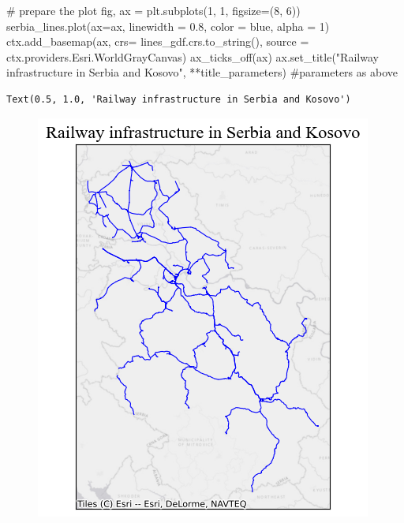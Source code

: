 \documentclass[
  letterpaper,
  DIV=11,
  numbers=noendperiod]{scrreprt}
\newenvironment{Shaded}{\begin{snugshade}}{\end{snugshade}}
\newcommand{\CommentTok}[1]{\textcolor[rgb]{0.37,0.37,0.37}{#1}}
\newcommand{\DecValTok}[1]{\textcolor[rgb]{0.68,0.00,0.00}{#1}}
\newcommand{\FloatTok}[1]{\textcolor[rgb]{0.68,0.00,0.00}{#1}}
\newcommand{\NormalTok}[1]{\textcolor[rgb]{0.00,0.23,0.31}{#1}}
\newcommand{\OperatorTok}[1]{\textcolor[rgb]{0.37,0.37,0.37}{#1}}
\newcommand{\StringTok}[1]{\textcolor[rgb]{0.13,0.47,0.30}{#1}}
\begin{document}
\begin{Shaded}
\begin{Highlighting}[]
\CommentTok{\# prepare the plot}
\NormalTok{fig, ax }\OperatorTok{=}\NormalTok{ plt.subplots(}\DecValTok{1}\NormalTok{, }\DecValTok{1}\NormalTok{, figsize}\OperatorTok{=}\NormalTok{(}\DecValTok{8}\NormalTok{, }\DecValTok{6}\NormalTok{))}
\NormalTok{serbia\_lines.plot(ax}\OperatorTok{=}\NormalTok{ax, linewidth }\OperatorTok{=} \FloatTok{0.8}\NormalTok{, color }\OperatorTok{=} \StringTok{\textquotesingle{}blue\textquotesingle{}}\NormalTok{, alpha }\OperatorTok{=} \DecValTok{1}\NormalTok{)}
\NormalTok{ctx.add\_basemap(ax, crs}\OperatorTok{=}\NormalTok{ lines\_gdf.crs.to\_string(), source }\OperatorTok{=}\NormalTok{ ctx.providers.Esri.WorldGrayCanvas)}
\NormalTok{ax\_ticks\_off(ax)}
\NormalTok{ax.set\_title(}\StringTok{"Railway infrastructure in Serbia and Kosovo"}\NormalTok{, }\OperatorTok{**}\NormalTok{title\_parameters) }\CommentTok{\#parameters as above}
\end{Highlighting}
\end{Shaded}

\begin{verbatim}
Text(0.5, 1.0, 'Railway infrastructure in Serbia and Kosovo')
\end{verbatim}

\begin{figure}[H]

{\centering \includegraphics{labs/w02_maps_files/figure-pdf/cell-13-output-2.png}

}

\end{figure}
\end{document}
